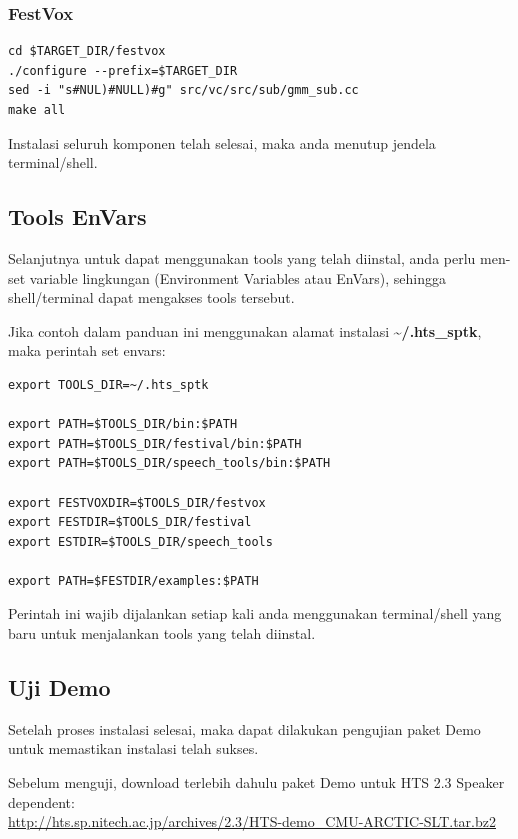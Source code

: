 \documentclass[12pt,]{article}
\begin{document}
	\subsubsection{FestVox}
	\begin{verbatim}
cd $TARGET_DIR/festvox
./configure --prefix=$TARGET_DIR
sed -i "s#NUL)#NULL)#g" src/vc/src/sub/gmm_sub.cc
make all
	\end{verbatim}

	Instalasi seluruh komponen telah selesai, maka anda menutup jendela terminal/shell.

	\newpage
	\subsection{Tools EnVars}

	Selanjutnya untuk dapat menggunakan tools yang telah diinstal,
	anda perlu men-set variable lingkungan (Environment Variables atau EnVars),
	sehingga shell/terminal dapat mengakses tools tersebut.

	Jika contoh dalam panduan ini menggunakan alamat instalasi \textbf{\textasciitilde/.hts\_sptk},
	maka perintah set envars:

	\begin{verbatim}
export TOOLS_DIR=~/.hts_sptk

export PATH=$TOOLS_DIR/bin:$PATH
export PATH=$TOOLS_DIR/festival/bin:$PATH
export PATH=$TOOLS_DIR/speech_tools/bin:$PATH

export FESTVOXDIR=$TOOLS_DIR/festvox
export FESTDIR=$TOOLS_DIR/festival
export ESTDIR=$TOOLS_DIR/speech_tools

export PATH=$FESTDIR/examples:$PATH
	\end{verbatim}

	Perintah ini wajib dijalankan setiap kali anda menggunakan terminal/shell yang baru untuk menjalankan tools yang telah diinstal.

	\subsection{Uji Demo}

	Setelah proses instalasi selesai, maka dapat dilakukan pengujian paket Demo untuk memastikan instalasi telah sukses.

	Sebelum menguji, download terlebih dahulu paket Demo untuk HTS 2.3 Speaker dependent:\\
	\url{http://hts.sp.nitech.ac.jp/archives/2.3/HTS-demo_CMU-ARCTIC-SLT.tar.bz2}
\end{document}
